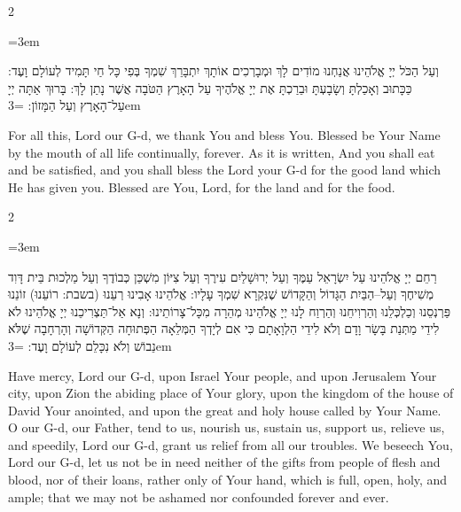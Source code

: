 \documentclass[11pt, openany]{book}
\newenvironment{bilingual}{%
  \par\vspace{4pt}%
  \begin{paracol}{2}%
}{%
  \end{paracol}%
  \par\vspace{2pt}%
}
\newenvironment{hebrewcol}{%
  \switchcolumn[1]%
  \begingroup
  \RTL
  \hebrewfont\large
  \setstretch{1.4}%
  \emergencystretch=3em
  \tolerance=9999
  \parindent=0pt\relax
}{%
  \endRTL
  \endgroup
}
\newenvironment{englishcol}{%
  \switchcolumn[0]%
  \begingroup
  \setstretch{1.4}%
  \emergencystretch=3em
  \tolerance=9999
  \normalsize
  \rightskip=0.12in\relax
}{%
  \endgroup
}
\begin{document}
\begin{bilingual}
\begin{hebrewcol}
וְעַל הַכֹּל יְיָ אֱלֹהֵינוּ אֲנַחְנוּ מוֹדִים לָךְ וּמְבָרְכִים אוֹתָךְ יִתְבָּרֵךְ שִׁמְךָ בְּפִי כָּל חַי תָּמִיד לְעוֹלָם וָעֶד: כַּכָּתוּב וְאָכַלְתָּ וְשָׂבָעְתָּ וּבֵרַכְתָּ אֶת יְיָ אֱלֹהֶיךָ עַל הָאָרֶץ הַטֹּבָה אֲשֶׁר נָתַן לָךְ: בָּרוּךְ אַתָּה יְיָ עַל־הָאָרֶץ וְעַל הַמָּזוֹן:
\end{hebrewcol}
\begin{englishcol}
For all this, Lord our G-d, we thank You and  bless You. Blessed be Your Name by the mouth of all life continually, forever. As it is written, And you shall eat and be satisfied, and you shall bless the Lord your G-d for the good land which He has given you. Blessed are You, Lord, for the land and for the food.
\end{englishcol}
\end{bilingual}
\begin{bilingual}
\begin{hebrewcol}
רַחֵם יְיָ אֱלֹהֵינוּ עַל יִשְׂרָאֵל עַמֶּךָ וְעַל יְרוּשָׁלַיִם עִירֶךָ וְעַל צִיּוֹן מִשְׁכַּן כְּבוֹדֶךָ וְעַל מַלְכוּת בֵּית דָּוִד מְשִׁיחֶךָ וְעַל–הַבַּיִת הַגָּדוֹל וְהַקָּדוֹשׁ שֶׁנִּקְרָא שִׁמְךָ עָלָיו: אֱלֹהֵינוּ אָבִינוּ רְעֵנוּ (בשבת: רוֹעֵנוּ) זוֹנֵנוּ פַּרְנְסֵנוּ וְכַלְכְּלֵנוּ וְהַרְוִיחֵנוּ וְהַרְוַח לָנוּ יְיָ אֱלֹהֵינוּ מְהֵרָה מִכָּל־צָרוֹתֵינוּ: וְנָא אַל־תַּצְרִיכֵנוּ יְיָ אֱלֹהֵינוּ לֹא לִידֵי מַתְּנַת בָּשָׂר וָדָם וְלֹא לִידֵי הַלְוָאָתָם כִּי אִם לְיָדְךָ הַמְּלֵאָה הַפְּתוּחָה הַקְּדוֹשָׁה וְהָרְחָבָה שֶׁלֹּא נֵבוֹשׁ וְלֹא נִכָּלֵם לְעוֹלָם וָעֶד:
\end{hebrewcol}
\begin{englishcol}
Have mercy, Lord our G-d, upon Israel Your people, and upon Jerusalem Your city, upon Zion the abiding place of Your glory, upon the kingdom of the house of David Your anointed, and upon the great and holy house called by Your Name. O our G-d, our Father, tend to us, nourish us, sustain us, support us, relieve us, and speedily, Lord our G-d, grant us relief from all our troubles. We beseech You, Lord our G-d, let us not be in need neither of the gifts from people of flesh and blood, nor of their loans, rather only of Your hand, which is full, open, holy, and ample; that we may not be ashamed nor confounded forever and ever.
\end{englishcol}
\end{bilingual}
\end{document}
